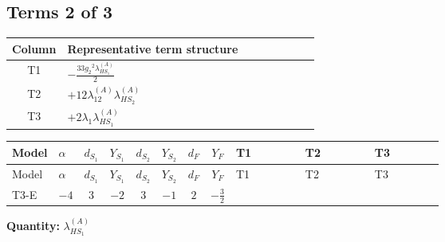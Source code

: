 \documentclass[8pt]{article}
\begin{document}
\begin{landscape}
\subsection*{Terms 2 of 3}
\begin{center}
\begin{tabular}{@{}c >{\raggedright\arraybackslash}p{0.82\linewidth}@{}}
\toprule
Column & Representative term structure \\
\midrule
T1 & \(\displaystyle -\frac{33 {g_2}^2 {\lambda_{HS_1}^{(A)}}}{2}\) \\
\midrule
T2 & \(\displaystyle +12 {\lambda_{12}^{(A)}} {\lambda_{HS_2}^{(A)}}\) \\
\midrule
T3 & \(\displaystyle +2 {\lambda_1} {\lambda_{HS_1}^{(A)}}\) \\
\midrule
\bottomrule
\end{tabular}
\end{center}
\smallskip
\tiny
\begin{longtable}{@{}llcccccc >{\raggedright\arraybackslash}p{0.21\linewidth} >{\raggedright\arraybackslash}p{0.21\linewidth} >{\raggedright\arraybackslash}p{0.21\linewidth}@{}}
\toprule
Model & $\alpha$ & $d_{S_1}$ & $Y_{S_1}$ & $d_{S_2}$ & $Y_{S_2}$ & $d_F$ & $Y_F$ & T1 & T2 & T3 \\
\midrule
\endfirsthead
\toprule
Model & $\alpha$ & $d_{S_1}$ & $Y_{S_1}$ & $d_{S_2}$ & $Y_{S_2}$ & $d_F$ & $Y_F$ & T1 & T2 & T3 \\
\midrule
\endhead
T3-E & $-4$ & $3$ & $-2$ & $3$ & $-1$ & $2$ & $-\frac{3}{2}$ & \scriptsize\adjustbox{max width=\linewidth}{$\begin{gathered} -\frac{33 {g_2}^2 {\lambda_{HS_1}^{(A)}}}{2}\end{gathered}$} & \scriptsize\adjustbox{max width=\linewidth}{$\begin{gathered} +12 {\lambda_{12}^{(A)}} {\lambda_{HS_2}^{(A)}}\end{gathered}$} & \scriptsize\adjustbox{max width=\linewidth}{$\begin{gathered} +2 {\lambda_1} {\lambda_{HS_1}^{(A)}}\end{gathered}$} \\
\midrule
\bottomrule
\end{longtable}
\clearpage
\noindent\textbf{Quantity: }$\lambda_{HS_1}^{(A)}$\par\smallskip

\end{landscape}
\end{document}
